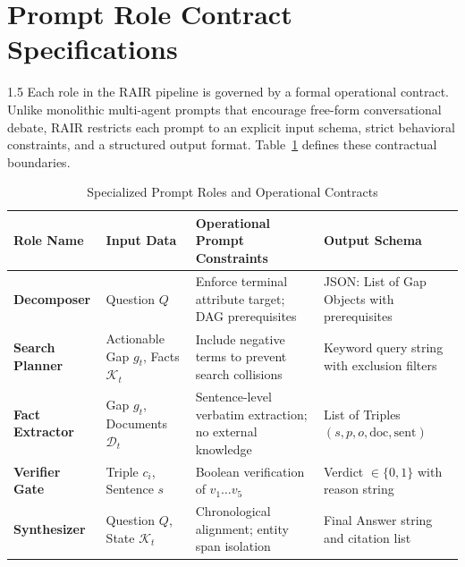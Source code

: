 \documentclass[12pt,a4paper]{report}
\begin{document}
\section{Prompt Role Contract Specifications}
\begin{spacing}{1.5}
Each role in the RAIR pipeline is governed by a formal operational contract. Unlike monolithic multi-agent prompts that encourage free-form conversational debate, RAIR restricts each prompt to an explicit input schema, strict behavioral constraints, and a structured output format. Table~\ref{tab:role_specs} defines these contractual boundaries.

\begin{table}[!htbp]
\centering
\small
\begin{tabular}{|p{2.8cm}|p{3.2cm}|p{4.2cm}|p{3.6cm}|}
\hline
\textbf{Role Name} & \textbf{Input Data} & \textbf{Operational Prompt Constraints} & \textbf{Output Schema} \\
\hline
\textbf{Decomposer} & Question $Q$ & Enforce terminal attribute target; DAG prerequisites & JSON: List of Gap Objects with prerequisites \\
\hline
\textbf{Search Planner} & Actionable Gap $g_t$, Facts $\mathcal{K}_t$ & Include negative terms to prevent search collisions & Keyword query string with exclusion filters \\
\hline
\textbf{Fact Extractor} & Gap $g_t$, Documents $\mathcal{D}_t$ & Sentence-level verbatim extraction; no external knowledge & List of Triples $(s, p, o, \text{doc}, \text{sent})$ \\
\hline
\textbf{Verifier Gate} & Triple $c_i$, Sentence $s$ & Boolean verification of $v_1 \dots v_5$ & Verdict $\in \{0, 1\}$ with reason string \\
\hline
\textbf{Synthesizer} & Question $Q$, State $\mathcal{K}_t$ & Chronological alignment; entity span isolation & Final Answer string and citation list \\
\hline
\end{tabular}
\caption{Specialized Prompt Roles and Operational Contracts}
\label{tab:role_specs}
\end{table}
\end{spacing}
\end{document}
